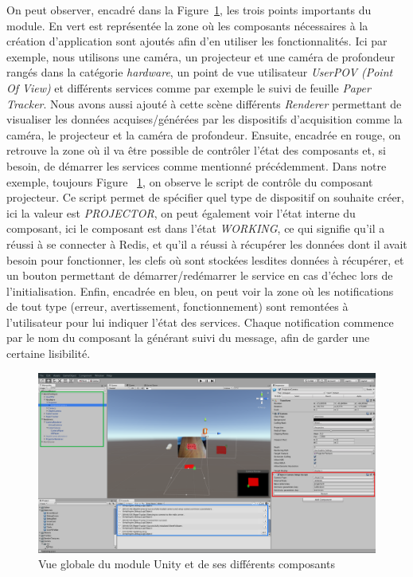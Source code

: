 On peut observer, encadré dans la Figure~\ref{fig:unity:plugin}, les trois points importants du module. 
En vert est représentée la zone où les composants nécessaires à la création d'application sont ajoutés afin d'en utiliser les fonctionnalités. Ici par exemple, nous utilisons une caméra, un projecteur et une caméra de profondeur rangés dans la catégorie \emph{hardware}, un point de vue utilisateur \emph{UserPOV (Point Of View)} et différents services comme par exemple le suivi de feuille \emph{Paper Tracker}. Nous avons aussi ajouté à cette scène différents \emph{Renderer} permettant de visualiser les données acquises/générées par les dispositifs d'acquisition comme la caméra, le projecteur et la caméra de profondeur.
Ensuite, encadrée en rouge, on retrouve la zone où il va être possible de contrôler l'état des composants et, si besoin, de démarrer les services comme mentionné précédemment. Dans notre exemple, toujours Figure ~\ref{fig:unity:plugin}, on observe le script de contrôle du composant projecteur. Ce script permet de spécifier quel type de dispositif on souhaite créer, ici la valeur est \emph{PROJECTOR}, on peut également voir l'état interne du composant, ici le composant est dans l'état \emph{WORKING}, ce qui signifie qu'il a réussi à se connecter à  Redis, et qu'il a réussi à récupérer les données dont il avait besoin pour fonctionner, les clefs où sont stockées lesdites données à récupérer, et un bouton permettant de démarrer/redémarrer le service en cas d'échec lors de l'initialisation.
Enfin, encadrée en bleu, on peut voir la zone où les notifications de tout type (erreur, avertissement, fonctionnement) sont remontées à l'utilisateur pour lui indiquer l'état des services. Chaque notification commence par le nom du composant la générant suivi du message, afin de garder une certaine lisibilité.

\begin{figure}[H]
\centering
\includegraphics[width=\linewidth]{images/unity-plugin}
\caption{Vue globale du module Unity et de ses différents composants}
\label{fig:unity:plugin}
\end{figure}

